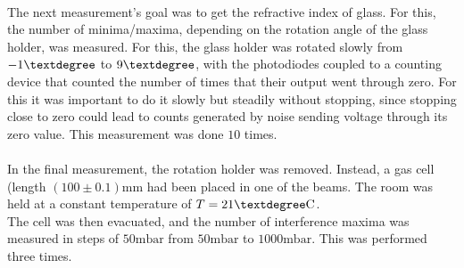 \\
The next measurement's goal was to get the refractive index of glass. For this, the number of minima/maxima, depending on the rotation angle of the glass holder, was measured. For this, the glass holder was rotated slowly from $-1\textdegree$ to $9\textdegree$, with the photodiodes coupled to a counting device that counted the number of times that their output went through zero. For this it was important to do it slowly but steadily without stopping, since stopping close to zero could lead to counts generated by noise sending voltage through its zero value. This measurement was done $10$ times.\\
\\
In the final measurement, the rotation holder was removed. Instead, a gas cell (length $(100\pm 0.1)\text{mm}$ had been placed in one of the beams. The room was held at a constant temperature of $T = \text{21} \textdegree\text{C}$.\\
The cell was then evacuated, and the number of interference maxima was measured in steps of $50 \text{mbar}$ from $50\text{mbar}$ to $1000\text{mbar}$. This was performed three times.
